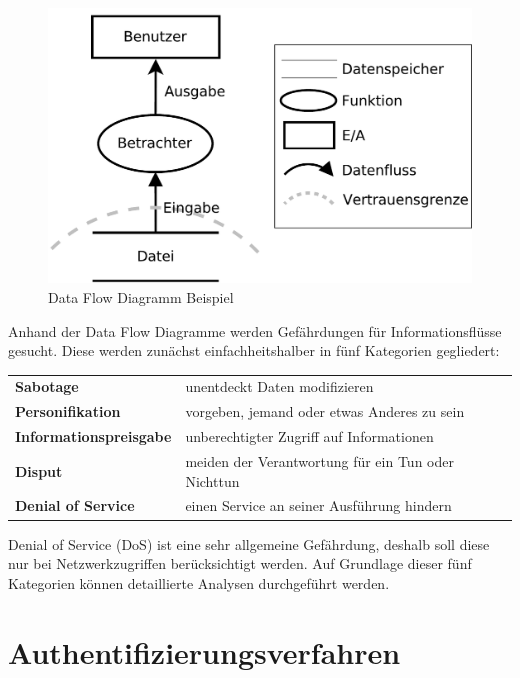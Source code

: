 \documentclass[11pt,a4paper]{report}
\begin{document}
\begin{figure}[htbp]
\centering
\includegraphics[scale=0.4]{images/dfd_intro.pdf}
\caption{Data Flow Diagramm Beispiel}
\label{fig:dfd_intro}
\end{figure}

Anhand der Data Flow Diagramme werden Gefährdungen für Informationsflüsse gesucht. Diese werden zunächst einfachheitshalber in fünf Kategorien gegliedert:

\begin{table}[h] %
\begin{tabularx}{\linewidth}{@{}lX@{}}
\textbf{Sabotage} & unentdeckt Daten modifizieren\\
\textbf{Personifikation} & vorgeben, jemand oder etwas Anderes zu sein\\
\textbf{Informationspreisgabe} & unberechtigter Zugriff auf Informationen\\
\textbf{Disput} & meiden der Verantwortung für ein Tun oder Nichttun\\
\textbf{Denial of Service} & einen Service an seiner Ausführung hindern\\
\end{tabularx}
\end{table}

Denial of Service (DoS) ist eine sehr allgemeine Gefährdung, deshalb soll diese nur bei Netzwerkzugriffen berücksichtigt werden. Auf Grundlage dieser fünf Kategorien können detaillierte Analysen durchgeführt werden.

\section{Authentifizierungsverfahren} \label{sec:auth_modells}
\end{document}
